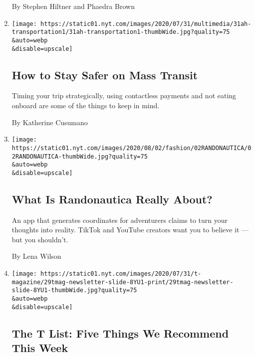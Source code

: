 \begin{enumerate}
  By Stephen Hiltner and Phaedra Brown
\item
  \href{/2020/08/01/at-home/coronavirus-public-transportation-subway.html}{}

  \texttt{[image: https://static01.nyt.com/images/2020/07/31/multimedia/31ah-transportation1/31ah-transportation1-thumbWide.jpg?quality=75\\\&auto=webp\\\&disable=upscale]}

  \hypertarget{how-to-stay-safer-on-mass-transit}{%
  \subsection{How to Stay Safer on Mass
  Transit}\label{how-to-stay-safer-on-mass-transit}}

  Timing your trip strategically, using contactless payments and not
  eating onboard are some of the things to keep in mind.

  By Katherine Cusumano
\item
  \href{/2020/07/31/style/randonautica-app.html}{}

  \texttt{[image: https://static01.nyt.com/images/2020/08/02/fashion/02RANDONAUTICA/02RANDONAUTICA-thumbWide.jpg?quality=75\\\&auto=webp\\\&disable=upscale]}

  \hypertarget{what-is-randonautica-really-about}{%
  \subsection{What Is Randonautica Really
  About?}\label{what-is-randonautica-really-about}}

  An app that generates coordinates for adventurers claims to turn your
  thoughts into reality. TikTok and YouTube creators want you to believe
  it --- but you shouldn't.

  By Lena Wilson
\item
  \href{/2020/07/30/t-magazine/the-t-list-five-things-we-recommend-this-week.html}{}

  \texttt{[image: https://static01.nyt.com/images/2020/07/31/t-magazine/29tmag-newsletter-slide-8YU1-print/29tmag-newsletter-slide-8YU1-thumbWide.jpg?quality=75\\\&auto=webp\\\&disable=upscale]}

  \hypertarget{the-t-list-five-things-we-recommend-this-week}{%
  \subsection{The T List: Five Things We Recommend This
  Week}\label{the-t-list-five-things-we-recommend-this-week}}


\end{enumerate}
